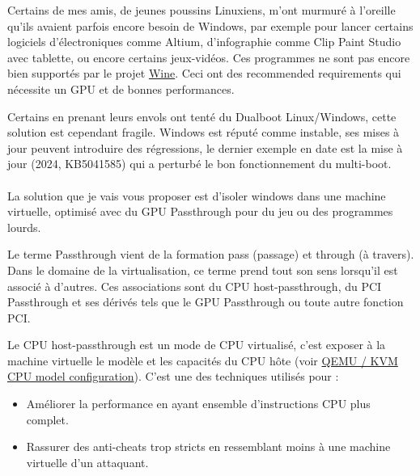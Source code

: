 \documentclass[a4paper,11pt]{article}
\title{
  \blogtitle{Du GPU Passthrough à la Nix pour du Windows}
}
\author{}
\date{}
\begin{document}

\maketitle

\thispagestyle{first}
\begin{blogmain}
Certains de mes amis, de jeunes poussins Linuxiens, m'ont murmuré à l'oreille qu'ils avaient parfois encore besoin de Windows, par exemple pour lancer certains logiciels d'électroniques comme Altium, d'infographie comme Clip Paint Studio avec tablette, ou encore certains jeux-vidéos. Ces programmes ne sont pas encore bien supportés par le projet \href{https://www.winehq.org}{Wine}. Ceci ont des recommended requirements qui nécessite un GPU et de bonnes performances.

Certains en prenant leurs envols ont tenté du Dualboot Linux/Windows, cette solution est cependant fragile.
Windows est réputé comme instable, ses mises à jour peuvent introduire des régressions, le dernier exemple en date est la mise à jour (2024, KB5041585) qui a perturbé le bon fonctionnement du multi-boot. \\
\\
La solution que je vais vous proposer est d'isoler windows dans une machine virtuelle, optimisé avec du GPU Passthrough pour du jeu ou des programmes lourds.

\newpage
Le terme Passthrough vient de la formation pass (passage) et through (à travers).
Dans le domaine de la virtualisation, ce terme prend tout son sens lorsqu'il est associé à d'autres.
Ces associations sont du CPU host-passthrough, du PCI Passthrough et ses dérivés tels que le GPU Passthrough ou toute autre fonction PCI.

Le CPU host-passthrough est un mode de CPU virtualisé, c'est exposer à la machine virtuelle le modèle et les capacités du CPU hôte (voir \href{https://www.qemu.org/docs/master/system/qemu-cpu-models.html}{QEMU / KVM CPU model configuration}).
C'est une des techniques utilisés pour :
\begin{itemize}
  \item Améliorer la performance en ayant ensemble d'instructions CPU plus complet.
  \item Rassurer des anti-cheats trop stricts en ressemblant moins à une machine virtuelle d'un attaquant.
\end{itemize}


\end{blogmain}
\end{document}
